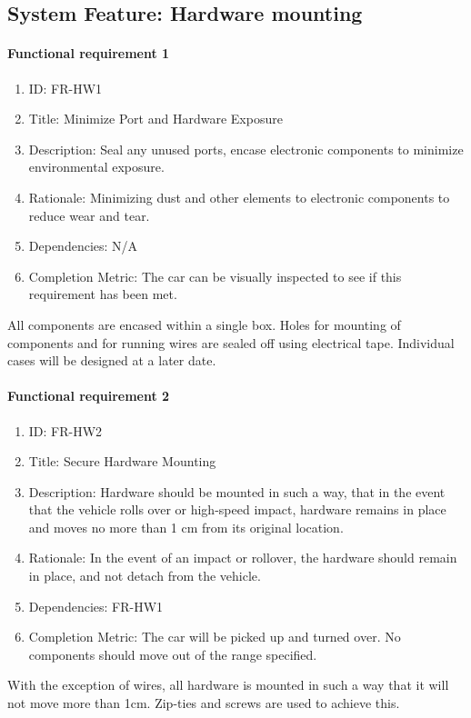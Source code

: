 \documentclass[compsoc,draftclsnofoot,onecolumn,10pt]{IEEEtran}
\begin{document}
\subsection{System Feature: Hardware mounting}
	\paragraph{\textbf{Functional requirement 1}}
		\begin{enumerate}
			\item ID: FR-HW1
			\item Title: Minimize Port and Hardware Exposure
			\item Description: Seal any unused ports, encase electronic components to minimize environmental exposure.
			\item Rationale: Minimizing dust and other elements to electronic components to reduce wear and tear.
			\item Dependencies: N/A
			\item Completion Metric: The car can be visually inspected to see if this requirement has been met. 
		\end{enumerate}
    All components are encased within a single box. Holes for mounting of components and for running wires are sealed off using electrical tape. Individual cases will be designed at a later date. 
    
	\paragraph{\textbf{Functional requirement 2}}
		\begin{enumerate}
			\item ID: FR-HW2
			\item Title: Secure Hardware Mounting
			\item Description: Hardware should be mounted in such a way, that in the event that the vehicle rolls over or high-speed impact, hardware remains in place and moves no more than 1 cm from its original location.
			\item Rationale: In the event of an impact or rollover, the hardware should remain in place, and not detach from the vehicle.
			\item Dependencies: FR-HW1
			\item Completion Metric: The car will be picked up and turned over. No components should move out of the range specified. 
		\end{enumerate}
    With the exception of wires, all hardware is mounted in such a way that it will not move more than 1cm. Zip-ties and screws are used to achieve this.
    
\end{document}
